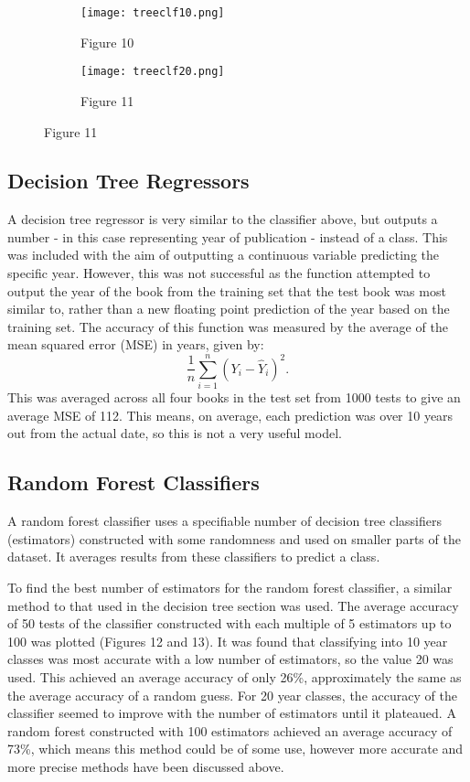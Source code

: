 \documentclass[11pt,a4paper,reqno]{amsart}
\begin{document}
\begin{figure}[!h]
\centering
\begin{subfigure}{.5\textwidth}
  \centering
  \texttt{[image: treeclf10.png]}
  \caption*{Figure 10}
\end{subfigure}%
\begin{subfigure}{.5\textwidth}
  \centering
  \texttt{[image: treeclf20.png]}
  \caption*{Figure 11}
\end{subfigure}
\end{figure}


\subsection{Decision Tree Regressors}
A decision tree regressor is very similar to the classifier above, but outputs a number - in this case representing year of publication - instead of a class. This was included with the aim of outputting a continuous variable predicting the specific year. However, this was not successful as the function attempted to output the year of the book from the training set that the test book was most similar to, rather than a new floating point prediction of the year based on the training set. The accuracy of this function was measured by the average of the mean squared error (MSE) in years, given by:
$$\frac{1}{n} \sum_{i=1}^{n} (Y_i - \hat{Y}_i)^2 .$$
This was averaged across all four books in the test set from 1000 tests to give an average MSE of 112. This means, on average, each prediction was over 10 years out from the actual date, so this is not a very useful model.

\subsection{Random Forest Classifiers}
A random forest classifier uses a specifiable number of decision tree classifiers (estimators) constructed with some randomness and used on smaller parts of the dataset. It averages results from these classifiers to predict a class.

To find the best number of estimators for the random forest classifier, a similar method to that used in the decision tree section was used. The average accuracy of 50 tests of the classifier constructed with each multiple of 5 estimators up to 100 was plotted (Figures 12 and 13). It was found that classifying into 10 year classes was most accurate with a low number of estimators, so the value 20 was used. This achieved an average accuracy of only 26\%, approximately the same as the average accuracy of a random guess. For 20 year classes, the accuracy of the classifier seemed to improve with the number of estimators until it plateaued. A random forest constructed with 100 estimators achieved an average accuracy of 73\%, which means this method could be of some use, however more accurate and more precise methods have been discussed above.
\end{document}
